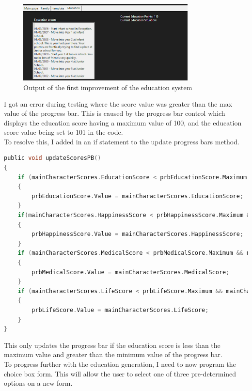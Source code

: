 \begin{figure}[H]
    \centering
    \includegraphics[width=0.8\textwidth]{images/implementation/educationTest4.png}
    \caption{Output of the first improvement of the education system}
    \label{fig:implementation-educationTest4}
\end{figure}
\noindent I got an error during testing where the score value was greater than the max value of the progress bar. This is caused by the progress bar control which displays the education score having a maximum value of 100, and the education score value being set to 101 in the code.\\
To resolve this, I added in an if statement to the update progress bars method.
\begin{lstlisting}[language=c, style=csharp, caption=Improved updateScoresPB procedure]
public void updateScoresPB()
{
    if (mainCharacterScores.EducationScore < prbEducationScore.Maximum && mainCharacterScores.EducationScore > prbEducationScore.Minimum)
    {
        prbEducationScore.Value = mainCharacterScores.EducationScore;
    }
    if(mainCharacterScores.HappinessScore < prbHappinessScore.Maximum && mainCharacterScores.HappinessScore > prbHappinessScore.Minimum)
    {
        prbHappinessScore.Value = mainCharacterScores.HappinessScore;
    }
    if (mainCharacterScores.MedicalScore < prbMedicalScore.Maximum && mainCharacterScores.MedicalScore > prbMedicalScore.Minimum)
    {
        prbMedicalScore.Value = mainCharacterScores.MedicalScore;
    }
    if (mainCharacterScores.LifeScore < prbLifeScore.Maximum && mainCharacterScores.LifeScore > prbLifeScore.Minimum)
    {
        prbLifeScore.Value = mainCharacterScores.LifeScore;
    }
}
\end{lstlisting}
This only updates the progress bar if the education score is less than the maximum value and greater than the minimum value of the progress bar.\\
To progress further with the education generation, I need to now program the choice box form. This will allow the user to select one of three pre-determined options on a new form.

